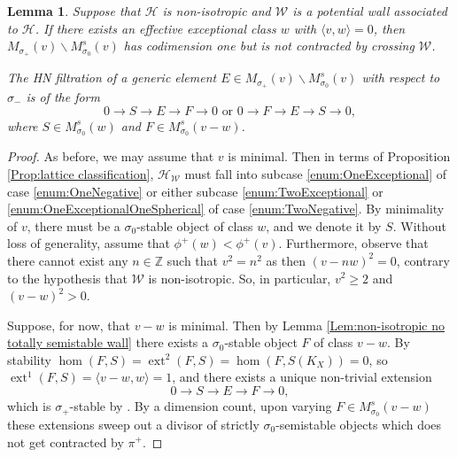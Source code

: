 \documentclass[leqno,11pt]{amsart}
\def\Z{\ensuremath{\mathbb{Z}}}
\def\ext{\mathop{\mathrm{ext}}\nolimits}
\newtheorem{Lem}[Thm]{Lemma}
\theoremstyle{definition}
\def\Z{\ensuremath{\mathbb{Z}}}
\def\HH{\ensuremath{\mathcal H}}
\def\WW{\ensuremath{\mathcal W}}
\begin{document}
\begin{Lem}
Suppose that $\HH$ is non-isotropic and $\WW$ is a potential wall associated to $\HH$.  If there exists an effective exceptional class $w$ with $\langle v,w\rangle=0$, then $M_{\sigma_+}(v)\backslash M^s_{\sigma_0}(v)$ has codimension one but is not contracted by crossing $\WW$.

The HN filtration of a generic element $E\in M_{\sigma_+}(v)\backslash M^s_{\sigma_0}(v)$ with respect to $\sigma_-$ is of the form $$0\to S\to E\to F\to 0\mbox{ or }0\to F\to E\to S\to 0,$$ where $S\in M^s_{\sigma_0}(w)$ and $F\in M^s_{\sigma_0}(v-w)$.
\end{Lem}
\begin{proof}
As before, we may assume that $v$ is minimal.  Then in terms of Proposition \ref{Prop:lattice classification}, $\HH_\WW$ must fall into subcase \ref{enum:OneExceptional} of case \ref{enum:OneNegative} or either subcase \ref{enum:TwoExceptional} or \ref{enum:OneExceptionalOneSpherical} of case \ref{enum:TwoNegative}.  By minimality of $v$, there must be a $\sigma_0$-stable object of class $w$, and we denote it by $S$.  Without loss of generality, assume that $\phi^+(w)<\phi^+(v)$.  Furthermore, observe that there cannot exist any $n\in\Z$ such that $v^2=n^2$ as then $(v-nw)^2=0$, contrary to the hypothesis that $\WW$ is non-isotropic.  So, in particular, $v^2\geq 2$ and $(v-w)^2>0$.

Suppose, for now, that $v-w$ is minimal.  Then by Lemma \ref{Lem:non-isotropic no totally semistable wall} there exists a $\sigma_0$-stable object $F$ of class $v-w$.  By stability $\hom(F,S)=\ext^2(F,S)=\hom(F,S(K_X))=0$, so $\ext^1(F,S)=\langle v-w,w\rangle=1$, and there exists a unique non-trivial extension $$0\to S\to E\to F\to 0,$$ which is $\sigma_+$-stable by \cite[Lemma 6.9]{BM14b}.  By a dimension count, upon varying $F\in M_{\sigma_0}^s(v-w)$ these extensions sweep out a divisor of strictly $\sigma_0$-semistable objects which does not get contracted by $\pi^+$.  


\end{proof}
\end{document}
